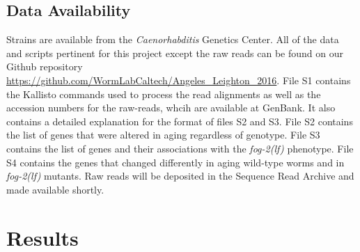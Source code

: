 \documentclass[10pt,letterpaper,twocolumn]{article}
\newcommand{\fog}{\emph{\mbox{fog-2(lf)}}}
\begin{document}
\subsection*{Data Availability}
\label{sb:data_availability}
Strains are available from the \emph{Caenorhabditis} Genetics Center. All of the
data and scripts pertinent for this project except the raw reads can be found on
our Github repository
\url{https://github.com/WormLabCaltech/Angeles_Leighton_2016}. File S1 contains
the Kallisto commands used to process the read alignments as well as the
accession numbers for the raw-reads, whcih are available at GenBank. It also
contains a detailed explanation for the format of files S2 and S3. File S2
contains the list of genes that were altered in aging regardless of genotype.
File S3 contains the list of genes and their associations with the \fog{}
phenotype. File S4 contains the genes that changed differently in aging
wild-type worms and in \fog{} mutants. Raw reads will be deposited in the
Sequence Read Archive and made available shortly.

\section*{Results}
\label{sec:results}
\end{document}
